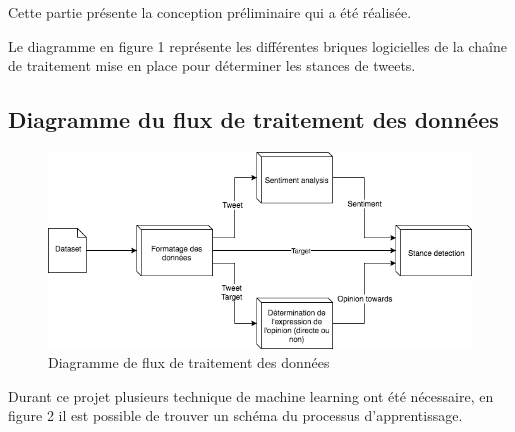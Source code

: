 \par Cette partie présente la conception préliminaire qui a été réalisée. \\

\par Le diagramme en figure 1 représente les différentes briques logicielles de la chaîne de traitement mise en place pour déterminer les stances de tweets.

\subsection{Diagramme du flux de traitement des données}
\begin{figure}[h!]
	\centerline{\includegraphics[scale=0.8]{img/diagramme_flux_traitement.png}}
	\caption{Diagramme de flux de traitement des données}
\end{figure}
\newpage


\par Durant ce projet plusieurs technique de machine learning ont été nécessaire, en figure 2 il est possible de trouver un schéma du processus d'apprentissage. \\ 

